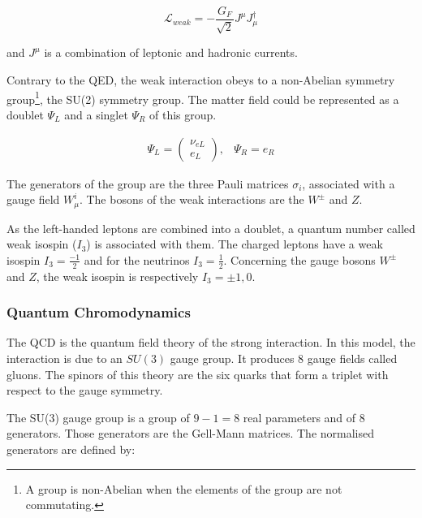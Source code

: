     \begin{equation}
      \mathcal{L}_{weak} = - \frac{G_F}{\sqrt{2}} J^{\mu}J_{\mu}^{\dagger}
    \end{equation}
    
     and $J^{\mu}$ is a combination of leptonic and hadronic currents.

    Contrary to the QED, the weak interaction obeys to a non-Abelian symmetry group\footnote{A group is non-Abelian when the elements of the group are not commutating.}, the SU(2) symmetry group.
    The matter field could be represented as a doublet $\Psi_L$ and a singlet $\Psi_R$ of this group.

    \begin{equation}
      \begin{array}{cc}
        \Psi_L = 
         \begin{pmatrix}
           \nu_{eL} \\
           e_L
         \end{pmatrix}, & \Psi_R = e_R
      \end{array}
    \end{equation}

    The generators of the group are the three Pauli matrices $\sigma_i$, associated with a gauge field $W_{\mu}^i$.
    The bosons of the weak interactions are the $W^{\pm}$ and $Z$.

    As the left-handed leptons are combined into a doublet, a quantum number called weak isospin ($I_3$) is associated with them.
    The charged leptons have a weak isospin $I_3 = \frac{-1}{2}$ and for the neutrinos $I_3 = \frac{1}{2}$.
    Concerning the gauge bosons $W^{\pm}$ and $Z$, the weak isospin is respectively $I_3 = \pm 1, 0$.
    
    \subsubsection{Quantum Chromodynamics}
    
    The \gls{QCD} is the quantum field theory of the strong interaction.
    In this model, the interaction is due to an $SU(3)$ gauge group. 
    It produces 8 gauge fields called gluons.
    The spinors of this theory are the six quarks that form a triplet with respect to the gauge symmetry.

    The SU(3) gauge group is a group of $9 - 1 = 8$ real parameters and of 8 generators. 
    Those generators are the Gell-Mann matrices. 
    The normalised generators are defined by: 
    
